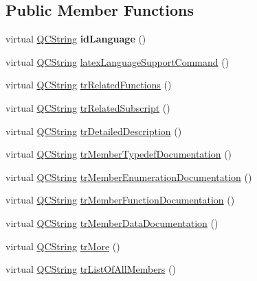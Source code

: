 \subsection*{Public Member Functions}
\begin{DoxyCompactItemize}
\item 
\mbox{\label{class_translator_swedish_ae672492c9bb299459df251aeaa4a0e14}} 
virtual \mbox{\hyperlink{class_q_c_string}{Q\+C\+String}} {\bfseries id\+Language} ()
\item 
virtual \mbox{\hyperlink{class_q_c_string}{Q\+C\+String}} \mbox{\hyperlink{class_translator_swedish_a10e82a85e36f4e05fd2f7addb77a2535}{latex\+Language\+Support\+Command}} ()
\item 
virtual \mbox{\hyperlink{class_q_c_string}{Q\+C\+String}} \mbox{\hyperlink{class_translator_swedish_ad6132738b6b5c699ef57165ddd905688}{tr\+Related\+Functions}} ()
\item 
virtual \mbox{\hyperlink{class_q_c_string}{Q\+C\+String}} \mbox{\hyperlink{class_translator_swedish_af73ad5a37d7bbde4fd8724e5c402722f}{tr\+Related\+Subscript}} ()
\item 
virtual \mbox{\hyperlink{class_q_c_string}{Q\+C\+String}} \mbox{\hyperlink{class_translator_swedish_adf44ce20dd921e6156d1ff9ff92fff26}{tr\+Detailed\+Description}} ()
\item 
virtual \mbox{\hyperlink{class_q_c_string}{Q\+C\+String}} \mbox{\hyperlink{class_translator_swedish_a4ba95b38a2629aa4c07cc8e41f692f33}{tr\+Member\+Typedef\+Documentation}} ()
\item 
virtual \mbox{\hyperlink{class_q_c_string}{Q\+C\+String}} \mbox{\hyperlink{class_translator_swedish_a12cb959fd35723b61ec509ffbd2d7787}{tr\+Member\+Enumeration\+Documentation}} ()
\item 
virtual \mbox{\hyperlink{class_q_c_string}{Q\+C\+String}} \mbox{\hyperlink{class_translator_swedish_ac77ff422e21e77dff023a1e9fde30a36}{tr\+Member\+Function\+Documentation}} ()
\item 
virtual \mbox{\hyperlink{class_q_c_string}{Q\+C\+String}} \mbox{\hyperlink{class_translator_swedish_a813fdb11c0e1636282c6ed93d009aa57}{tr\+Member\+Data\+Documentation}} ()
\item 
virtual \mbox{\hyperlink{class_q_c_string}{Q\+C\+String}} \mbox{\hyperlink{class_translator_swedish_a1eb7501e5f51086d66a561144140c86c}{tr\+More}} ()
\item 
virtual \mbox{\hyperlink{class_q_c_string}{Q\+C\+String}} \mbox{\hyperlink{class_translator_swedish_a0e98147c3c73f79fba668ec0dee85403}{tr\+List\+Of\+All\+Members}} ()

\end{DoxyCompactItemize}

